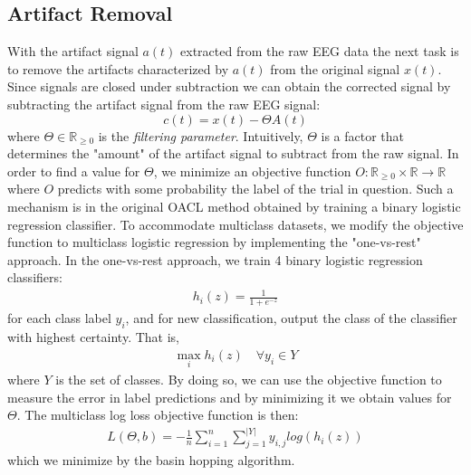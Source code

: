 \subsection{Artifact Removal}
With the artifact signal $a(t)$ extracted from the raw EEG data the next task is to remove the artifacts characterized by $a(t)$ from the original signal $x(t)$. Since signals are closed under subtraction we can obtain the corrected signal by subtracting the artifact signal from the raw EEG signal:
\begin{equation}
\label{eq:correctedsignal}
c(t) = x(t) - \Theta A(t)
\end{equation}
where $\Theta \in \mathbb{R}_{\geq 0}$ is the \emph{filtering parameter}. Intuitively, $\Theta$ is a factor that determines the "amount" of the artifact signal to subtract from the raw signal. 
In order to find a value for $\Theta$, we minimize an objective function $O : \mathbb{R}_{\geq 0} \times \mathbb{R} \rightarrow \mathbb{R}$ where $O$ predicts with some probability the label of the trial in question. Such a mechanism is in the original OACL method obtained by training a binary logistic regression classifier. To accommodate multiclass datasets, we modify the objective function to multiclass logistic regression by implementing the "one-vs-rest" approach. In the one-vs-rest approach, we train 4 binary logistic regression classifiers: 
\begin{align}
h_i(z) = \frac{1}{1+e^{-z}}
\end{align} for each class label $y_i$, and for new classification, output the class of the classifier with highest certainty. That is,
\begin{align}
\max_{i}h_i(z) \quad \forall y_i \in Y
\end{align}
where $Y$ is the set of classes.
By doing so, we can use the objective function to measure the error in label predictions and by minimizing it we obtain values for $\Theta$. The multiclass log loss objective function is then:
\begin{align}
L(\Theta, b) = -\frac{1}{n}\sum_{i=1}^{n}\sum_{j=1}^{|Y|}y_{i,j} log(h_i(z))
\end{align}
which we minimize by the basin hopping algorithm. 